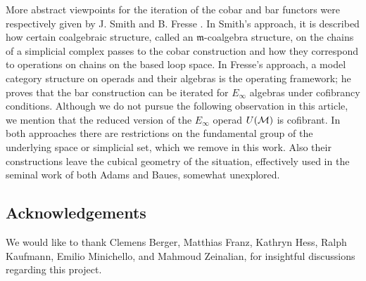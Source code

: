 More abstract viewpoints for the iteration of the cobar and bar functors were respectively given by J. Smith \cite{smith1994cobar} and B. Fresse \cite{fresse2010props}.
In Smith's approach, it is described how certain coalgebraic structure, called an $\mathfrak{m}$-coalgebra structure, on the chains of a simplicial complex passes to the cobar construction and how they correspond to operations on chains on the based loop space.
In Fresse's approach, a model category structure on operads and their algebras is the operating framework; he proves that the bar construction can be iterated for $E_\infty$ algebras under cofibrancy conditions.
Although we do not pursue the following observation in this article, we mention that the reduced version of the $E_\infty$ operad $U(\mathcal{M})$ is cofibrant. In both approaches there are restrictions on the fundamental group of the underlying space or simplicial set, which we remove in this work. Also their constructions leave the cubical geometry of the situation, effectively used in the seminal work of both Adams and Baues, somewhat unexplored.

\subsection*{Acknowledgements}

We would like to thank Clemens Berger, Matthias Franz, Kathryn Hess, Ralph Kaufmann, Emilio Minichello, and Mahmoud Zeinalian, for insightful discussions regarding this project.